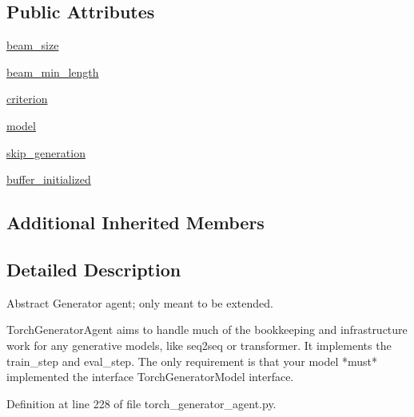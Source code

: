 \subsection*{Public Attributes}
\begin{DoxyCompactItemize}
\item 
\hyperlink{classparlai_1_1core_1_1torch__generator__agent_1_1TorchGeneratorAgent_acf02a68b75948cf5bafb24be48813127}{beam\+\_\+size}
\item 
\hyperlink{classparlai_1_1core_1_1torch__generator__agent_1_1TorchGeneratorAgent_a63f7f11d4917e843498e95dc87e30eb1}{beam\+\_\+min\+\_\+length}
\item 
\hyperlink{classparlai_1_1core_1_1torch__generator__agent_1_1TorchGeneratorAgent_aa6f478c963651331f919fc0ebd44bac3}{criterion}
\item 
\hyperlink{classparlai_1_1core_1_1torch__generator__agent_1_1TorchGeneratorAgent_a3b661c0eb6f3e65f061908142819bdc2}{model}
\item 
\hyperlink{classparlai_1_1core_1_1torch__generator__agent_1_1TorchGeneratorAgent_a713b4b7ae6d30a664c97c4ea121f8e38}{skip\+\_\+generation}
\item 
\hyperlink{classparlai_1_1core_1_1torch__generator__agent_1_1TorchGeneratorAgent_a427057bbe1b2182e5bbd476b7739de31}{buffer\+\_\+initialized}
\end{DoxyCompactItemize}
\subsection*{Additional Inherited Members}


\subsection{Detailed Description}
\begin{DoxyVerb}Abstract Generator agent; only meant to be extended.

TorchGeneratorAgent aims to handle much of the bookkeeping and
infrastructure work for any generative models, like seq2seq or transformer.
It implements the train_step and eval_step. The only requirement is that
your model *must* implemented the interface TorchGeneratorModel interface.
\end{DoxyVerb}
 

Definition at line 228 of file torch\+\_\+generator\+\_\+agent.\+py.



